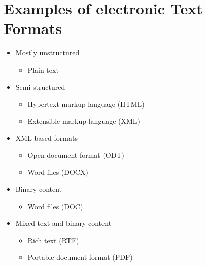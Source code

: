 \documentclass[a4paper, 11pt, accentcolor = tud3b]{tudreport}
\begin{document}
        \section{Examples of electronic Text Formats} %
        	\begin{itemize}
        		\item Mostly unstructured
        			\begin{itemize}
        				\item Plain text
        			\end{itemize}
        		\item Semi-structured
        			\begin{itemize}
        				\item Hypertext markup language (HTML)
        				\item Extensible markup language (XML)
        			\end{itemize}
        		\item XML-based formats
        			\begin{itemize}
        				\item Open document format (ODT)
        				\item Word files (DOCX)
        			\end{itemize}
        		\item Binary content
        			\begin{itemize}
        				\item Word files (DOC)
        			\end{itemize}
        		\item Mixed text and binary content
        			\begin{itemize}
        				\item Rich text (RTF)
        				\item Portable document format (PDF)
        			\end{itemize}
        	\end{itemize}
\end{document}
